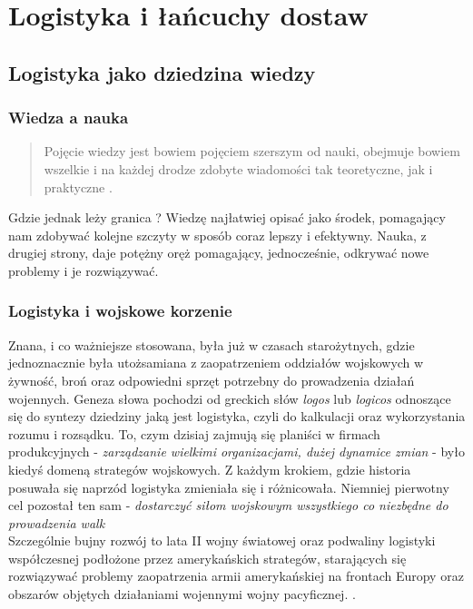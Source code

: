 \chapter{Logistyka i łańcuchy dostaw}
\label{c2:c2}

\section{Logistyka jako dziedzina wiedzy}
	\subsection{Wiedza a nauka}	
		\begin{quote}
			Pojęcie wiedzy jest bowiem pojęciem szerszym od nauki,
			obejmuje bowiem wszelkie i na każdej drodze zdobyte wiadomości
			tak teoretyczne, jak i praktyczne \cite{organizacja_badan_ocen_prac_naukowych}.
		\end{quote}
		Gdzie jednak leży granica ? Wiedzę najłatwiej opisać jako środek, pomagający 
		nam zdobywać kolejne szczyty w sposób coraz lepszy i efektywny. Nauka, z drugiej strony,
		daje potężny oręż pomagający, jednocześnie, odkrywać nowe problemy i je rozwiązywać.
	\subsection{Logistyka i wojskowe korzenie}
		Znana, i co ważniejsze stosowana, była już w czasach starożytnych, gdzie jednoznacznie
		była utożsamiana z zaopatrzeniem oddziałów wojskowych w żywność, broń oraz odpowiedni
		sprzęt potrzebny do prowadzenia działań wojennych. Geneza słowa pochodzi od greckich
		słów \emph{logos} lub \emph{logicos} odnoszące się do syntezy dziedziny jaką jest logistyka,
		czyli do kalkulacji oraz wykorzystania rozumu i rozsądku. To, czym dzisiaj zajmują się planiści w 
		firmach produkcyjnych - \emph{zarządzanie wielkimi organizacjami, dużej dynamice zmian} - było kiedyś 
		domeną strategów wojskowych. Z każdym krokiem, gdzie historia posuwała
		się naprzód logistyka zmieniała się i różnicowała. Niemniej pierwotny cel pozostał ten sam - 
		\emph{dostarczyć siłom wojskowym wszystkiego co niezbędne do prowadzenia walk} \\
		Szczególnie bujny rozwój to lata II wojny światowej oraz podwaliny logistyki współczesnej
		podłożone przez amerykańskich strategów, starających się rozwiązywać problemy zaopatrzenia
		armii amerykańskiej na frontach Europy oraz obszarów objętych działaniami wojennymi wojny pacyficznej. 
		\cite{logistyka_w_przedsiebiorstwie}\cite{logistyka_jako_dziedzina_wiedzy_cz1}.
